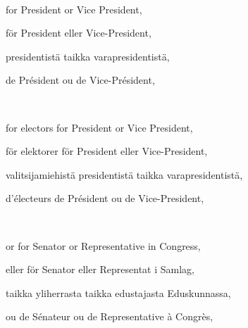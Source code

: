 \documentclass[a4paper,landscape,12pt]{article}
\begin{document}
~

\begin{minipage}[t]{0.22\textwidth}
	 for President or Vice President,
\end{minipage}\textwidth
\begin{minipage}[t]{0.22\textwidth}
	för President eller Vice-President,
\end{minipage}\textwidth
\begin{minipage}[t]{0.22\textwidth}
	presidentistä taikka varapresidentistä,
\end{minipage}\textwidth
\begin{minipage}[t]{0.22\textwidth}
	de Président ou de Vice-Président,
\end{minipage}

~

\begin{minipage}[t]{0.22\textwidth}
for electors for President or Vice President,
\end{minipage}\textwidth
\begin{minipage}[t]{0.22\textwidth}
för elektorer för President eller Vice-President,
\end{minipage}\textwidth
\begin{minipage}[t]{0.22\textwidth}
valitsijamiehistä presidentistä taikka varapresidentistä,
\end{minipage}\textwidth
\begin{minipage}[t]{0.22\textwidth}
d'électeurs de Président ou de Vice-President,
\end{minipage}

~

\begin{minipage}[t]{0.22\textwidth}
	 or for Senator or Representative in Congress,
\end{minipage}\textwidth
\begin{minipage}[t]{0.22\textwidth}
eller för Senator eller Representat i Samlag,
\end{minipage}\textwidth
\begin{minipage}[t]{0.22\textwidth}
	taikka yliherrasta taikka edustajasta Eduskunnassa,
\end{minipage}\textwidth
\begin{minipage}[t]{0.22\textwidth}
	ou de Sénateur ou de Representative à Congrès,
\end{minipage}
\end{document}
